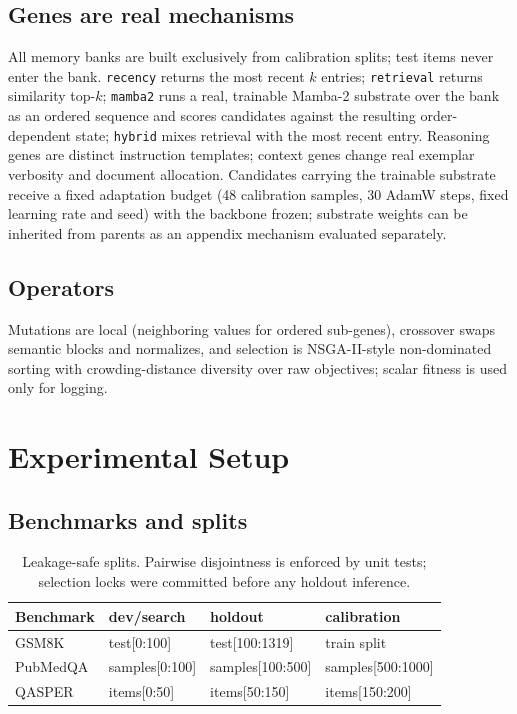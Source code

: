 \documentclass[11pt]{article}
\begin{document}
\subsection{Genes are real mechanisms}

All memory banks are built exclusively from calibration splits; test items
never enter the bank. \texttt{recency} returns the most recent $k$ entries;
\texttt{retrieval} returns similarity top-$k$; \texttt{mamba2} runs a real,
trainable Mamba-2 substrate over the bank as an ordered sequence and scores
candidates against the resulting order-dependent state; \texttt{hybrid}
mixes retrieval with the most recent entry. Reasoning genes are distinct
instruction templates; context genes change real exemplar verbosity and
document allocation. Candidates carrying the trainable substrate receive a
fixed adaptation budget (48 calibration samples, 30 AdamW steps, fixed
learning rate and seed) with the backbone frozen; substrate weights can be
inherited from parents as an appendix mechanism evaluated separately.

\subsection{Operators}

Mutations are local (neighboring values for ordered sub-genes), crossover
swaps semantic blocks and normalizes, and selection is NSGA-II-style
non-dominated sorting with crowding-distance diversity over raw objectives;
scalar fitness is used only for logging.

\section{Experimental Setup}

\subsection{Benchmarks and splits}

\begin{table}[h]
\centering\small
\begin{tabular}{@{}llll@{}}
\toprule
Benchmark & dev/search & holdout & calibration \\
\midrule
GSM8K & test[0:100] & test[100:1319] & train split \\
PubMedQA & samples[0:100] & samples[100:500] & samples[500:1000] \\
QASPER & items[0:50] & items[50:150] & items[150:200] \\
\bottomrule
\end{tabular}
\caption{Leakage-safe splits. Pairwise disjointness is enforced by unit
tests; selection locks were committed before any holdout inference.}
\label{tab:splits}
\end{table}
\end{document}
